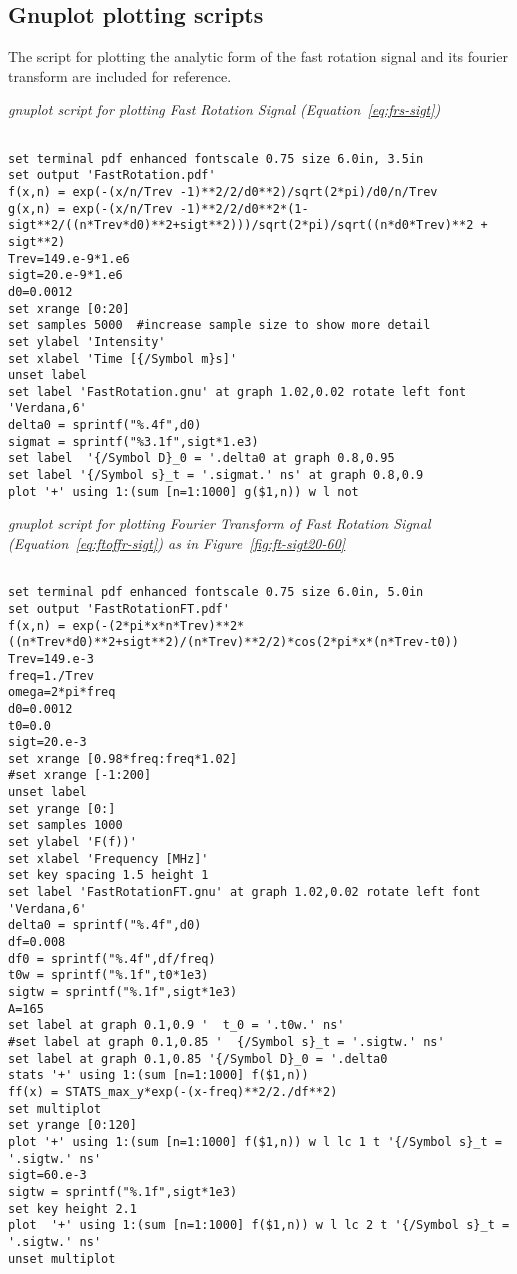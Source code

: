 \documentclass[10pt]{article}
\begin{document}
\subsection{Gnuplot plotting scripts}
The script for plotting the analytic form of the fast rotation signal and its fourier transform are included for reference.
\begin{flushleft}
{\it gnuplot script for plotting Fast Rotation Signal (Equation~\ref{eq:frs-sigt})}
\end{flushleft}
\begingroup
\fontsize{8pt}{12pt}\selectfont
\begin{verbatim}

set terminal pdf enhanced fontscale 0.75 size 6.0in, 3.5in
set output 'FastRotation.pdf'
f(x,n) = exp(-(x/n/Trev -1)**2/2/d0**2)/sqrt(2*pi)/d0/n/Trev
g(x,n) = exp(-(x/n/Trev -1)**2/2/d0**2*(1-sigt**2/((n*Trev*d0)**2+sigt**2)))/sqrt(2*pi)/sqrt((n*d0*Trev)**2 + sigt**2)
Trev=149.e-9*1.e6
sigt=20.e-9*1.e6
d0=0.0012
set xrange [0:20]
set samples 5000  #increase sample size to show more detail
set ylabel 'Intensity'
set xlabel 'Time [{/Symbol m}s]'
unset label
set label 'FastRotation.gnu' at graph 1.02,0.02 rotate left font 'Verdana,6'
delta0 = sprintf("%.4f",d0)
sigmat = sprintf("%3.1f",sigt*1.e3)
set label  '{/Symbol D}_0 = '.delta0 at graph 0.8,0.95
set label '{/Symbol s}_t = '.sigmat.' ns' at graph 0.8,0.9
plot '+' using 1:(sum [n=1:1000] g($1,n)) w l not

\end{verbatim}
\endgroup

\begin{flushleft}
{\it gnuplot script for plotting Fourier Transform of Fast Rotation Signal (Equation~\ref{eq:ftoffr-sigt}) as in Figure~\ref{fig:ft-sigt20-60}}
\end{flushleft}
\begingroup
\fontsize{8pt}{12pt}\selectfont
\begin{verbatim}

set terminal pdf enhanced fontscale 0.75 size 6.0in, 5.0in
set output 'FastRotationFT.pdf'
f(x,n) = exp(-(2*pi*x*n*Trev)**2*((n*Trev*d0)**2+sigt**2)/(n*Trev)**2/2)*cos(2*pi*x*(n*Trev-t0))
Trev=149.e-3
freq=1./Trev
omega=2*pi*freq
d0=0.0012
t0=0.0
sigt=20.e-3
set xrange [0.98*freq:freq*1.02]
#set xrange [-1:200]
unset label
set yrange [0:]
set samples 1000
set ylabel 'F(f))'
set xlabel 'Frequency [MHz]'
set key spacing 1.5 height 1
set label 'FastRotationFT.gnu' at graph 1.02,0.02 rotate left font 'Verdana,6'
delta0 = sprintf("%.4f",d0)
df=0.008
df0 = sprintf("%.4f",df/freq)
t0w = sprintf("%.1f",t0*1e3)
sigtw = sprintf("%.1f",sigt*1e3)
A=165
set label at graph 0.1,0.9 '  t_0 = '.t0w.' ns'
#set label at graph 0.1,0.85 '  {/Symbol s}_t = '.sigtw.' ns'
set label at graph 0.1,0.85 '{/Symbol D}_0 = '.delta0
stats '+' using 1:(sum [n=1:1000] f($1,n))
ff(x) = STATS_max_y*exp(-(x-freq)**2/2./df**2)
set multiplot
set yrange [0:120]
plot '+' using 1:(sum [n=1:1000] f($1,n)) w l lc 1 t '{/Symbol s}_t = '.sigtw.' ns'
sigt=60.e-3
sigtw = sprintf("%.1f",sigt*1e3)
set key height 2.1
plot  '+' using 1:(sum [n=1:1000] f($1,n)) w l lc 2 t '{/Symbol s}_t = '.sigtw.' ns'
unset multiplot
\end{verbatim}
\endgroup
\end{document}
